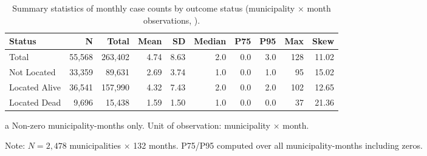 \begin{table}[htbp]
\centering
\caption{Summary statistics of monthly case counts by outcome status (municipality $\times$ month observations, \studyperiod{}).}\label{tab:summary}
\begin{tabular}{lrrrrrrrrr}
  \toprule
  \textbf{Status} & \textbf{N}\tnote{a} & \textbf{Total} & \textbf{Mean} & \textbf{SD} & \textbf{Median} & \textbf{P75} & \textbf{P95} & \textbf{Max} & \textbf{Skew} \\
  \midrule
  Total & 55,568 & 263,402 & 4.74 & 8.63 & 2.0 & 0.0 & 3.0 & 128 & 11.02 \\
  Not Located & 33,359 & 89,631 & 2.69 & 3.74 & 1.0 & 0.0 & 1.0 & 95 & 15.02 \\
  Located Alive & 36,541 & 157,990 & 4.32 & 7.43 & 2.0 & 0.0 & 2.0 & 102 & 12.65 \\
  Located Dead & 9,696 & 15,438 & 1.59 & 1.50 & 1.0 & 0.0 & 0.0 & 37 & 21.36 \\
  \bottomrule
\end{tabular}
\begin{tablenotes}
\small
\item[a] Non-zero municipality-months only. Unit of observation: municipality $\times$ month.
\item Note: $N = 2{,}478$ municipalities $\times$ 132 months. P75/P95 computed over all municipality-months including zeros.
\end{tablenotes}
\end{table}
